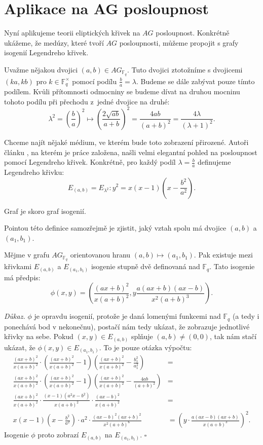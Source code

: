 \documentclass[12pt]{report}
\begin{document}
\section{Aplikace na AG posloupnost}

Nyní aplikujeme teorii eliptických křivek na $AG$ posloupnost. Konkrétně ukážeme, že medúzy, které tvoří $AG$ posloupnosti, můžeme propojit s grafy isogenií Legendreho křivek.


Uvažme nějakou dvojici $(a,b) \in AG_{\mathbb{F}_q}$. Tuto dvojici ztotožníme s dvojicemi $(ka,kb)$ pro $k \in \mathbb{F}_q ^{\times}$ pomocí podílu $\frac{b}{a} = \lambda$. Budeme se dále zabývat pouze tímto podílem. Kvůli přítomnosti odmocniny se budeme dívat na druhou mocninu tohoto podílu při přechodu z~jedné dvojice na druhé:
$$\lambda^2 =\left(\frac{b}{a}\right)^2 \longmapsto \left(\frac{2 \sqrt{ab}}{a+b}\right)^2 = \frac{4ab}{(a+b)^2} = \frac{4 \lambda}{(\lambda+1)^2}.$$

Chceme najít nějaké médium, ve kterém bude toto zobrazení přirozené. Autoři článku \cite{Meduza}, na kterém je práce založena, našli velmi elegantní pohled na posloupnost pomocí Legendreho křivek. Konkrétně, pro každý podíl $\lambda = \frac{b}{a}$ definujeme Legendreho křivku:
$$E_{(a,b)} = E_{\lambda ^2} : y^2 = x(x-1)\left(x - \frac{b^2}{a^2} \right).$$


\begin{veta}\label{lol}
Graf je skoro graf isogenií.
\end{veta}

Pointou této definice samozřejmě je zjistit, jaký vztah spolu má dvojice $(a,b)$ a $(a_1,b_1)$.
\begin{veta}
Mějme v grafu $AG_{\mathbb{F}_q}$ orientovanou hranu $(a,b) \longmapsto (a_1,b_1)$. Pak existuje mezi křivkami $E_{(a,b)}$ a $E_{(a_1,b_1)}$ isogenie stupně dvě definovaná nad $\mathbb{F}_q$. Tato isogenie má předpis:
$$\phi(x,y) = \left(\frac{(ax+b)^2}{x (a+b)^2 }, y \frac{a(ax+b)(ax-b)}{x^2 (a+b)^3 } \right).$$
\end{veta}
\noindent \textit{Důkaz.} $\phi$ je opravdu isogenií, protože je daná lomenými funkcemi nad $\mathbb{F}_q$ (a tedy i ponechává bod v nekonečnu), postačí nám tedy ukázat, že zobrazuje jednotlivé křivky na sebe. Pokud $(x,y) \in E_{(a,b)}$ splňuje $(a,b) \neq (0,0)$, tak nám stačí ukázat, že $\phi(x,y) \in E_{(a_1,b_1)}$. To je pouze otázka výpočtu:
\begin{align*}
\frac{(ax+b)^2}{x(a+b)^2 } \cdot \left(\frac{(ax+b)^2}{x(a+b)^2 } - 1 \right) \left(\frac{(ax+b)^2}{x(a+b)^2} - \frac{b_1 ^2}{a_1 ^2} \right) &=\\
\frac{(ax+b)^2}{x(a+b)^2 } \cdot \left(\frac{(ax+b)^2}{x(a+b)^2 } - 1 \right) \left(\frac{(ax+b)^2}{x(a+b)^2 } - \frac{4ab}{(a+b)^2} \right) &=\\
\frac{(ax+b)^2}{x(a+b)^2 } \cdot \frac{(x-1)(a^2 x - b^2)}{x(a+b)^2 } \cdot \frac{(ax-b)^2}{x(a+b)^2 } &=\\
x(x-1)\left(x - \frac{b^2}{a^2} \right) \cdot a^2 \cdot \frac{(ax-b)^2 (ax+b)^2}{x^2 (a+b)^6} &= \left(y \cdot  \frac{a(ax-b)(ax+b)}{x(a+b)^3} \right)^2.
\end{align*} 
Isogenie $\phi$ proto zobrazí $E_{(a,b)}$ na $E_{(a_1,b_1)}$. \hfill $\square$\\
\end{document}
